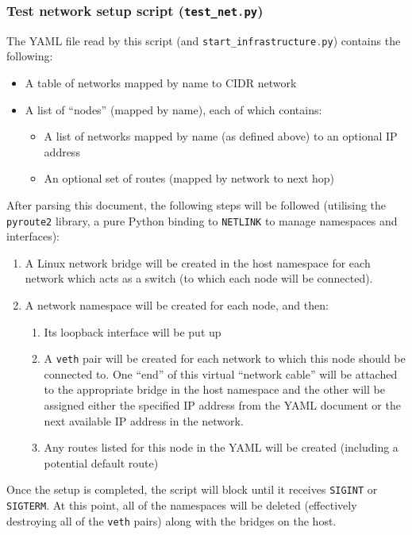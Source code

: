 \documentclass[a4paper]{article}
\numberwithin{figure}{section}
\numberwithin{table}{section}
\newcommand{\mi}{\mintinline}
\begin{document}
\subsubsection{Test network setup script (\mi{c}{test_net.py})}
The YAML file read by this script (and \mi{c}{start_infrastructure.py}) contains the following:
\begin{itemize}
	\item A table of networks mapped by name to CIDR network
	\item A list of ``nodes'' (mapped by name), each of which contains:
		\begin{itemize}
			\item A list of networks mapped by name (as defined above) to an optional IP address
			\item An optional set of routes (mapped by network to next hop)
		\end{itemize}
\end{itemize}

After parsing this document, the following steps will be followed (utilising the \mi{python}{pyroute2} library, a pure Python binding to \mi{c}{NETLINK} to manage namespaces and interfaces):
\begin{enumerate}
	\item A Linux network bridge will be created in the host namespace for each network which acts as a switch (to which each node will be connected).
	\item A network namespace will be created for each node, and then:
		\begin{enumerate}
			\item Its loopback interface will be put up
			\item A \mi{c}{veth} pair will be created for each network to which this node should be connected to. One ``end'' of this virtual ``network cable'' will be attached to the appropriate bridge in the host namespace and the other will be assigned either the specified IP address from the YAML document or the next available IP address in the network.
			\item Any routes listed for this node in the YAML will be created (including a potential default route)
		\end{enumerate}
\end{enumerate}

Once the setup is completed, the script will block until it receives \mi{c}{SIGINT} or \mi{c}{SIGTERM}. At this point, all of the namespaces will be deleted (effectively destroying all of the \mi{c}{veth} pairs) along with the bridges on the host.
\end{document}
